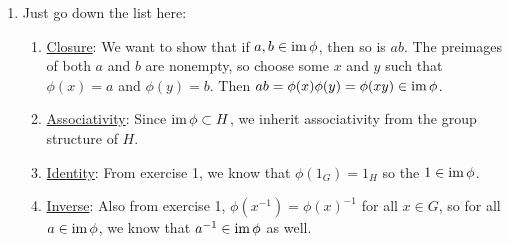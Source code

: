 \documentclass[]{article}
\newcommand{\im}{\text{im\,}}
\begin{document}
\begin{enumerate}
\item Just go down the list here:
\begin{enumerate}
\item \underline{Closure}: We want to show that if $a, b \in \im\phi$, then so is $ab$. The preimages of both $a$ and $b$ are nonempty, so choose some $x$ and $y$ such that $\phi(x) = a$ and $\phi(y) = b$. Then $ab = \phi(x)\phi(y) = \phi(xy) \in \im\phi$.
\item \underline{Associativity}: Since $\im\phi \subset H$, we inherit associativity from the group structure of $H$.
\item \underline{Identity}: From exercise 1, we know that $\phi(1_G) = 1_H$ so the $1 \in \im\phi$.
\item \underline{Inverse}: Also from exercise 1, $\phi(x^{-1}) = \phi(x)^{-1}$ for all $x \in G$, so for all $a \in \im\phi$, we know that $a^{-1} \in \im\phi$ as well.
\end{enumerate}





\end{enumerate}
\end{document}
